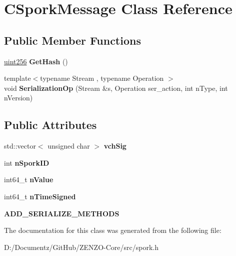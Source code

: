 \hypertarget{class_c_spork_message}{}\section{C\+Spork\+Message Class Reference}
\label{class_c_spork_message}
\subsection*{Public Member Functions}
\begin{DoxyCompactItemize}
\item 
\mbox{\label{class_c_spork_message_aa71d5976465a8edb3f11901b14b9df65}} 
\mbox{\hyperlink{classuint256}{uint256}} {\bfseries Get\+Hash} ()
\item 
\mbox{\label{class_c_spork_message_a9c8cdb184cb0f7ddcf490eb9efe147ec}} 
{\footnotesize template$<$typename Stream , typename Operation $>$ }\\void {\bfseries Serialization\+Op} (Stream \&s, Operation ser\+\_\+action, int n\+Type, int n\+Version)
\end{DoxyCompactItemize}
\subsection*{Public Attributes}
\begin{DoxyCompactItemize}
\item 
\mbox{\label{class_c_spork_message_a23740331f22a1ed4a8af5a299a618cc1}} 
std\+::vector$<$ unsigned char $>$ {\bfseries vch\+Sig}
\item 
\mbox{\label{class_c_spork_message_a081216533339aed53adbb0dad2a78f73}} 
int {\bfseries n\+Spork\+ID}
\item 
\mbox{\label{class_c_spork_message_ae15a1fa999993177b2549c4316c89643}} 
int64\+\_\+t {\bfseries n\+Value}
\item 
\mbox{\label{class_c_spork_message_a66a80692ffda8526efa272bb2847030b}} 
int64\+\_\+t {\bfseries n\+Time\+Signed}
\item 
\mbox{\label{class_c_spork_message_afcbd5a0f8bdeebe3794088bf29136071}} 
{\bfseries A\+D\+D\+\_\+\+S\+E\+R\+I\+A\+L\+I\+Z\+E\+\_\+\+M\+E\+T\+H\+O\+DS}
\end{DoxyCompactItemize}


The documentation for this class was generated from the following file\+:\begin{DoxyCompactItemize}
\item 
D\+:/\+Documentz/\+Git\+Hub/\+Z\+E\+N\+Z\+O-\/\+Core/src/spork.\+h\end{DoxyCompactItemize}
